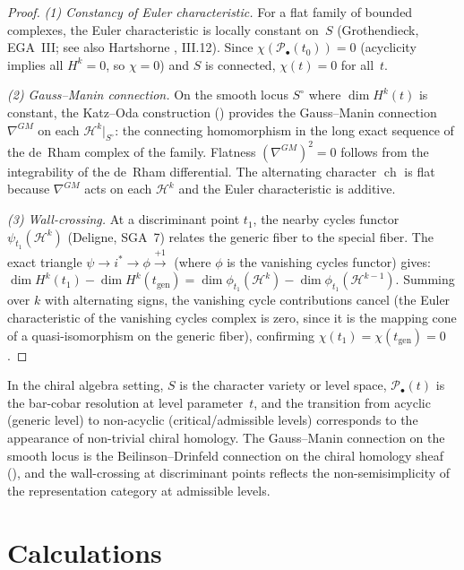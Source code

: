 \begin{proof}
\emph{(1) Constancy of Euler characteristic.}
For a flat family of bounded complexes, the Euler characteristic is
locally constant on~$S$ (Grothendieck, EGA~III; see also Hartshorne
\cite{Har77}, III.12).  Since $\chi(\mathcal{P}_\bullet(t_0)) = 0$
(acyclicity implies all $H^k = 0$, so $\chi = 0$) and $S$ is connected,
$\chi(t) = 0$ for all~$t$.

\emph{(2) Gauss--Manin connection.}
On the smooth locus $S^{\circ}$ where $\dim H^k(t)$ is constant, the
Katz--Oda construction (\cite{KO68}) provides the Gauss--Manin connection
$\nabla^{GM}$ on each $\mathcal{H}^k|_{S^{\circ}}$: the connecting
homomorphism in the long exact sequence of the de~Rham complex of the
family.  Flatness $(\nabla^{GM})^2 = 0$ follows from the integrability
of the de~Rham differential.  The alternating character $\operatorname{ch}$
is flat because $\nabla^{GM}$ acts on each $\mathcal{H}^k$ and the
Euler characteristic is additive.

\emph{(3) Wall-crossing.}
At a discriminant point $t_1$, the nearby cycles functor
$\psi_{t_1}(\mathcal{H}^k)$ (Deligne, SGA~7) relates the generic fiber
to the special fiber.  The exact triangle
$\psi \to i^* \to \phi \xrightarrow{+1}$ (where $\phi$ is the
vanishing cycles functor) gives:
$\dim H^k(t_1) - \dim H^k(t_{\mathrm{gen}})
= \dim \phi_{t_1}(\mathcal{H}^k) - \dim \phi_{t_1}(\mathcal{H}^{k-1})$.
Summing over $k$ with alternating signs, the vanishing cycle
contributions cancel (the Euler characteristic of the vanishing cycles
complex is zero, since it is the mapping cone of a quasi-isomorphism on
the generic fiber), confirming $\chi(t_1) = \chi(t_{\mathrm{gen}}) = 0$.
\end{proof}

\begin{remark}[Context]
In the chiral algebra setting, $S$ is the character variety or level space,
$\mathcal{P}_\bullet(t)$ is the bar-cobar resolution at level parameter~$t$,
and the transition from acyclic (generic level) to non-acyclic
(critical/admissible levels) corresponds to the appearance of non-trivial
chiral homology.  The Gauss--Manin connection on the smooth locus is the
Beilinson--Drinfeld connection on the chiral homology sheaf (\cite{BD04}),
and the wall-crossing at discriminant points reflects the non-semisimplicity
of the representation category at admissible levels.
\end{remark}

\section{Calculations}\label{sec:module-calculations}


